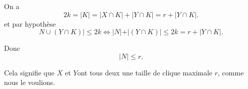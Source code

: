 \begin{sol}
On a $$ 2k = |K| = |X\cap K| + |Y\cap K| = r + |Y\cap K|. $$
et par hypothèse
$$N \cup (Y \cap K) | \leq 2k \Leftrightarrow |N | + |(Y \cap K) | \leq 2k = r + |Y\cap K|.$$

Donc $$| N | \leq r. $$

Cela signifie que $X $ et $Y $ont tous deux une taille de clique maximale $r$, comme nous le voulions.

\end{sol}
